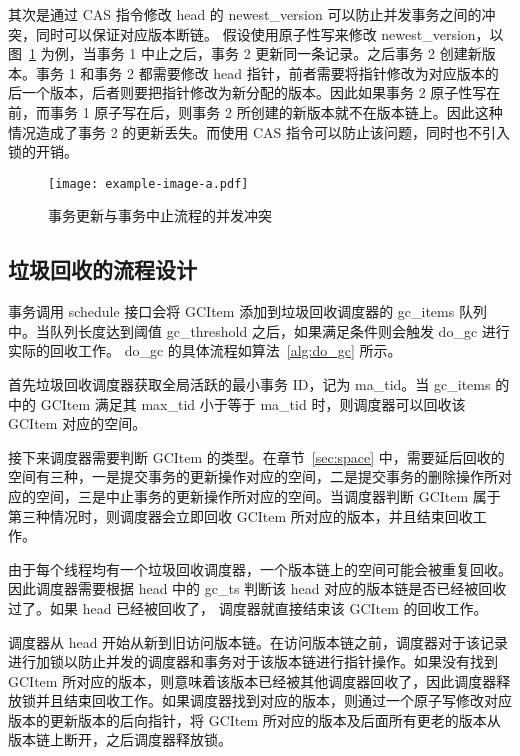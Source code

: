其次是通过 CAS 指令修改 head 的 newest\_version 可以防止并发事务之间的冲突，同时可以保证对应版本断链。
假设使用原子性写来修改 newest\_version，以图~\ref{fig:update-abort-update} 为例，当事务 1 中止之后，事务 2 更新同一条记录。之后事务 2 创建新版本。事务 1 和事务 2 都需要修改 head 指针，前者需要将指针修改为对应版本的后一个版本，后者则要把指针修改为新分配的版本。因此如果事务 2 原子性写在前，而事务 1 原子写在后，则事务 2 所创建的新版本就不在版本链上。因此这种情况造成了事务 2 的更新丢失。而使用 CAS 指令可以防止该问题，同时也不引入锁的开销。

\begin{figure}
    \centering
    \texttt{[image: example-image-a.pdf]}
    \caption{事务更新与事务中止流程的并发冲突}
    \label{fig:update-abort-update}
\end{figure}



\subsection{垃圾回收的流程设计}
\label{ssec:gc-implement}

事务调用 schedule 接口会将 GCItem 添加到垃圾回收调度器的 gc\_items 队列中。当队列长度达到阈值 gc\_threshold 之后，如果满足条件则会触发 do\_gc 进行实际的回收工作。
do\_gc 的具体流程如算法~\ref{alg:do_gc} 所示。

首先垃圾回收调度器获取全局活跃的最小事务 ID，记为 ma\_tid。当 gc\_items 的中的
GCItem 满足其 max\_tid 小于等于 ma\_tid 时，则调度器可以回收该 GCItem 对应的空间。

接下来调度器需要判断 GCItem 的类型。在章节~\ref{sec:space} 中，需要延后回收的空间有三种，一是提交事务的更新操作对应的空间，二是提交事务的删除操作所对应的空间，三是中止事务的更新操作所对应的空间。当调度器判断 GCItem 属于第三种情况时，则调度器会立即回收 GCItem 所对应的版本，并且结束回收工作。


由于每个线程均有一个垃圾回收调度器，一个版本链上的空间可能会被重复回收。
因此调度器需要根据 head 中的 gc\_ts 判断该 head 对应的版本链是否已经被回收过了。如果 head 已经被回收了，
调度器就直接结束该 GCItem 的回收工作。

调度器从 head 开始从新到旧访问版本链。在访问版本链之前，调度器对于该记录进行加锁以防止并发的调度器和事务对于该版本链进行指针操作。如果没有找到 GCItem 所对应的版本，则意味着该版本已经被其他调度器回收了，因此调度器释放锁并且结束回收工作。如果调度器找到对应的版本，则通过一个原子写修改对应版本的更新版本的后向指针，将 GCItem 所对应的版本及后面所有更老的版本从版本链上断开，之后调度器释放锁。

